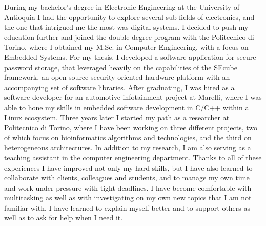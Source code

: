 During my bachelor's degree in Electronic Engineering at the University of Antioquia I had the opportunity to explore several sub-fields of electronics, and the one that intrigued me the most was digital systems. I decided to push my education further and joined the double degree program with the Politecnico di Torino, where I obtained my M.Sc. in Computer Engineering, with a focus on Embedded Systems.
For my thesis, I developed a software application for secure password storage, that leveraged heavily on the capabilities of the SEcube framework, an open-source security-oriented hardware platform with an accompanying set of software libraries.
After graduating, I was hired as a software developer for an automotive infotainment project at Marelli, where I was able to hone my skills in embedded software development in C/C++ within a Linux ecosystem.
Three years later I started my path as a researcher at Politecnico di Torino, where I have been working on three different projects, two of which focus on bioinformatics algorithms and technologies, and the third on heterogeneous architectures. In addition to my research, I am also serving as a teaching assistant in the computer engineering department.
Thanks to all of these experiences I have improved not only my hard skills, but I have also learned to collaborate with clients, colleagues and students, and to manage my own time and work under pressure with tight deadlines. I have become comfortable with multitasking as well as with investigating on my own new topics that I am not familiar with. I have learned to explain myself better and to support others as well as to ask for help when I need it.
